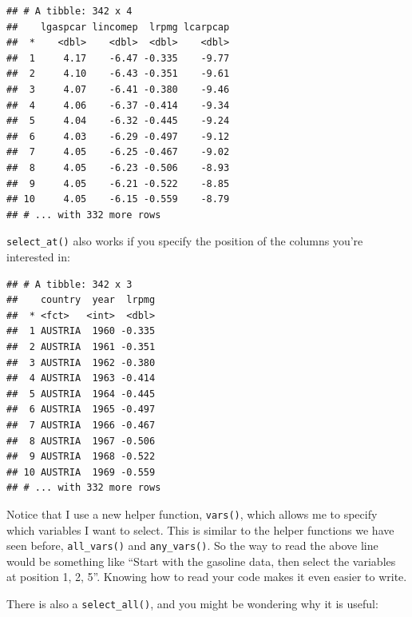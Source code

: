 \documentclass[]{gitbook}
\newenvironment{Shaded}{\begin{snugshade}}{\end{snugshade}}
\newcommand{\DecValTok}[1]{\textcolor[rgb]{0.00,0.00,0.81}{#1}}
\newcommand{\KeywordTok}[1]{\textcolor[rgb]{0.13,0.29,0.53}{\textbf{#1}}}
\newcommand{\NormalTok}[1]{#1}
\newcommand{\OperatorTok}[1]{\textcolor[rgb]{0.81,0.36,0.00}{\textbf{#1}}}
\newcommand{\StringTok}[1]{\textcolor[rgb]{0.31,0.60,0.02}{#1}}
\theoremstyle{definition}
\theoremstyle{definition}
\theoremstyle{definition}
\theoremstyle{remark}
\begin{document}
\begin{verbatim}
## # A tibble: 342 x 4
##    lgaspcar lincomep  lrpmg lcarpcap
##  *    <dbl>    <dbl>  <dbl>    <dbl>
##  1     4.17    -6.47 -0.335    -9.77
##  2     4.10    -6.43 -0.351    -9.61
##  3     4.07    -6.41 -0.380    -9.46
##  4     4.06    -6.37 -0.414    -9.34
##  5     4.04    -6.32 -0.445    -9.24
##  6     4.03    -6.29 -0.497    -9.12
##  7     4.05    -6.25 -0.467    -9.02
##  8     4.05    -6.23 -0.506    -8.93
##  9     4.05    -6.21 -0.522    -8.85
## 10     4.05    -6.15 -0.559    -8.79
## # ... with 332 more rows
\end{verbatim}

\texttt{select\_at()} also works if you specify the position of the
columns you're interested in:

\begin{Shaded}
\end{Shaded}

\begin{verbatim}
## # A tibble: 342 x 3
##    country  year  lrpmg
##  * <fct>   <int>  <dbl>
##  1 AUSTRIA  1960 -0.335
##  2 AUSTRIA  1961 -0.351
##  3 AUSTRIA  1962 -0.380
##  4 AUSTRIA  1963 -0.414
##  5 AUSTRIA  1964 -0.445
##  6 AUSTRIA  1965 -0.497
##  7 AUSTRIA  1966 -0.467
##  8 AUSTRIA  1967 -0.506
##  9 AUSTRIA  1968 -0.522
## 10 AUSTRIA  1969 -0.559
## # ... with 332 more rows
\end{verbatim}

Notice that I use a new helper function, \texttt{vars()}, which allows
me to specify which variables I want to select. This is similar to the
helper functions we have seen before, \texttt{all\_vars()} and
\texttt{any\_vars()}. So the way to read the above line would be
something like ``Start with the gasoline data, then select the variables
at position 1, 2, 5''. Knowing how to read your code makes it even
easier to write.

There is also a \texttt{select\_all()}, and you might be wondering why
it is useful:

\begin{Shaded}
\end{Shaded}
\end{document}
